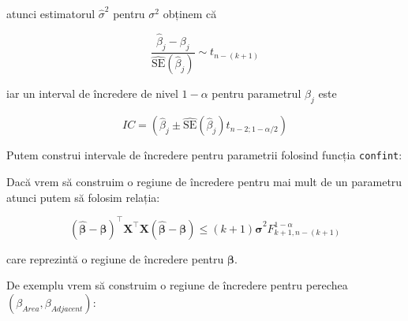 \documentclass[]{article}
\newenvironment{Shaded}{\begin{snugshade}}{\end{snugshade}}
\newcommand{\KeywordTok}[1]{\textcolor[rgb]{0.13,0.29,0.53}{\textbf{#1}}}
\newcommand{\FloatTok}[1]{\textcolor[rgb]{0.00,0.00,0.81}{#1}}
\newcommand{\OperatorTok}[1]{\textcolor[rgb]{0.81,0.36,0.00}{\textbf{#1}}}
\newcommand{\NormalTok}[1]{#1}
\begin{document}
atunci estimatorul \(\hat\sigma^2\) pentru \(\sigma^2\) obținem că

\[
\frac{\hat\beta_j-\beta_j}{\hat{\mathrm{SE}}(\hat\beta_j)}\sim t_{n-(k+1)}
\]

iar un interval de încredere de nivel \(1-\alpha\) pentru parametrul
\(\beta_j\) este

\[
IC = \left(\hat\beta_j\pm\hat{\mathrm{SE}}(\hat\beta_j)t_{n-2;1-\alpha/2}\right)
\]

Putem construi intervale de încredere pentru parametrii folosind funcția
\texttt{confint}:

\begin{Shaded}
\end{Shaded}

Dacă vrem să construim o regiune de încredere pentru mai mult de un
parametru atunci putem să folosim relația:

\[
(\hat{\boldsymbol \beta} - \boldsymbol \beta)^\intercal\boldsymbol X^\intercal \boldsymbol X (\hat{\boldsymbol \beta} - \boldsymbol \beta)\leq (k+1)\hat{\boldsymbol \sigma}^2F_{k+1, n-(k+1)}^{1-\alpha}
\]

care reprezintă o regiune de încredere pentru \(\boldsymbol \beta\).

De exemplu vrem să construim o regiune de încredere pentru perechea
\((\beta_{Area},\beta_{Adjacent})\):
\end{document}
